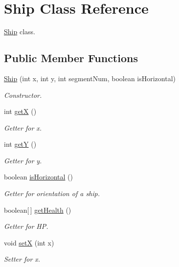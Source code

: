 \hypertarget{classShip}{}\section{Ship Class Reference}
\label{classShip}


\hyperlink{classShip}{Ship} class.  


\subsection*{Public Member Functions}
\begin{DoxyCompactItemize}
\item 
\hyperlink{classShip_aad9f864d03a4d6e4410ef058a07a887d}{Ship} (int x, int y, int segment\+Num, boolean is\+Horizontal)
\begin{DoxyCompactList}\small\item\em Constructor. \end{DoxyCompactList}\item 
int \hyperlink{classShip_a1cb1ffc138ae22488954a8f9cbd7a227}{getX} ()
\begin{DoxyCompactList}\small\item\em Getter for x. \end{DoxyCompactList}\item 
int \hyperlink{classShip_a7dd07d0fdb652e1ce70f2442d6b1171c}{getY} ()
\begin{DoxyCompactList}\small\item\em Getter for y. \end{DoxyCompactList}\item 
boolean \hyperlink{classShip_a5931f11cfaaecf82200263373d777249}{is\+Horizontal} ()
\begin{DoxyCompactList}\small\item\em Getter for orientation of a ship. \end{DoxyCompactList}\item 
boolean\mbox{[}$\,$\mbox{]} \hyperlink{classShip_ab18527e0957bdb9a286a91fea5bfd500}{get\+Health} ()
\begin{DoxyCompactList}\small\item\em Getter for HP. \end{DoxyCompactList}\item 
void \hyperlink{classShip_ae5dfe53a340d63db1dfcda3d43138775}{setX} (int x)
\begin{DoxyCompactList}\small\item\em Setter for x. \end{DoxyCompactList}\item 

\end{DoxyCompactItemize}
